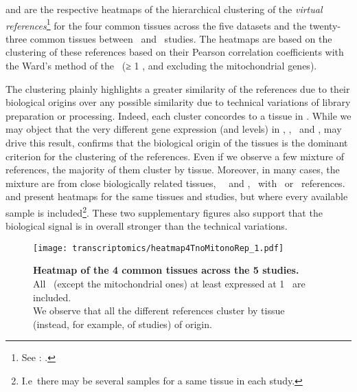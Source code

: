  and 
are the respective heatmaps of the hierarchical clustering
of the \emph{virtual references}\footnote{See :
.}
for the four common tissues across the five datasets and the
twenty-three common tissues between \uhlen\ and \gtex\ studies.
The heatmaps are based on the clustering of these references based on
their Pearson correlation coefficients with the Ward's method
of the \pcgs\ (≥ 1 \FPKM, and excluding
the mitochondrial genes).

The clustering plainly highlights a greater similarity of the references
due to their biological origins over any possible
similarity due to technical variations of library preparation or processing.
Indeed, each cluster concordes to a tissue in .
While we may object that
the very different gene expression (and levels) in
\Heart, \Kidney, \Liver\ and \Testis,
may drive this result,
 confirms that the biological origin of the tissues
is the dominant criterion for the clustering of the references.
Even if we observe a few mixture of references,
the majority of them cluster by tissue.
Moreover, in many cases, the mixture are from close biologically related tissues,
\eg\ \fallopian\ and \Ovary, \salivary\
with \Esophagus\ or \Stomach\ references.
 and 
present heatmaps for the same tissues and studies,
but where every available sample is included\footnote{I.e\
there may be several samples for a same tissue in each study.}.
These two supplementary figures also support that
the biological signal is in overall stronger than the technical variations.

\begin{figure}[!htpb]
    \texttt{[image: transcriptomics/heatmap4TnoMitonoRep\_1.pdf]}\centering
    \caption[Heatmap of the 4 common tissues across the 5 studies]%
    {\label{fig:noMitoNoRep4T}\textbf{Heatmap of the 4 common tissues
    across the 5 studies.}\\All \pcgs\ (except the mitochondrial
    ones) at least expressed at 1 \FPKM\ are included.\\We observe that all the
    different references cluster by tissue (instead, for example, of studies)
    of origin.}
\end{figure}

